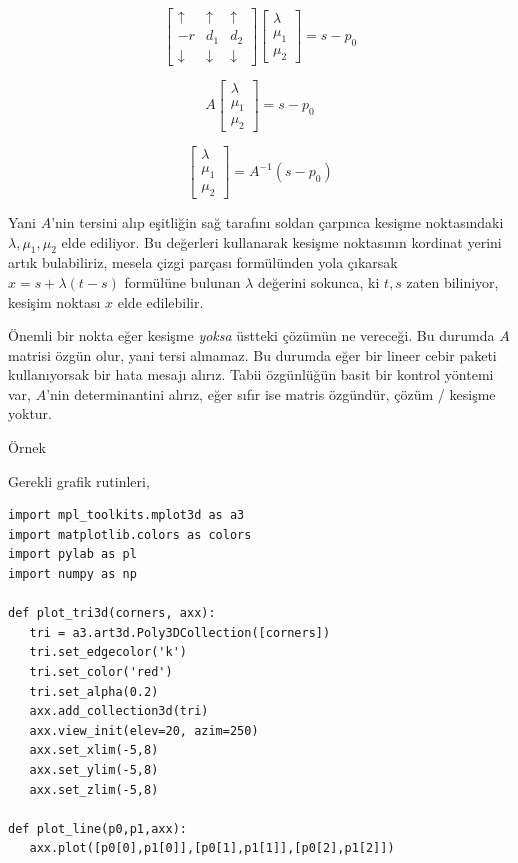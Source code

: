 \documentclass[12pt,fleqn]{article}\usepackage{../../common}
\begin{document}
$$
\left[\begin{array}{ccc}
\uparrow & \uparrow & \uparrow  \\
 -r & d_1 & d_2 \\
\downarrow & \downarrow & \downarrow 
\end{array}\right]
\left[\begin{array}{ccc}
\lambda \\ \mu_1 \\ \mu_2 
\end{array}\right] = s - p_0
$$

$$
A
\left[\begin{array}{ccc}
\lambda \\ \mu_1 \\ \mu_2 
\end{array}\right] = s - p_0
$$

$$
\left[\begin{array}{ccc}
\lambda \\ \mu_1 \\ \mu_2 
\end{array}\right] = A^{-1} (s - p_0)
$$

Yani $A$'nin tersini alıp eşitliğin sağ tarafını soldan çarpınca kesişme
noktasındaki $\lambda,\mu_1,\mu_2$ elde ediliyor. Bu değerleri kullanarak
kesişme noktasının kordinat yerini artık bulabiliriz, mesela çizgi parçası
formülünden yola çıkarsak $x = s + \lambda (t-s)$ formülüne bulunan $\lambda$
değerini sokunca, ki $t,s$ zaten biliniyor, kesişim noktası $x$ elde edilebilir.

Önemli bir nokta eğer kesişme {\em yoksa} üstteki çözümün ne vereceği. Bu
durumda $A$ matrisi özgün olur, yani tersi alınamaz. Bu durumda eğer bir lineer
cebir paketi kullanıyorsak bir hata mesajı alırız. Tabii özgünlüğün basit bir
kontrol yöntemi var, $A$'nin determinantini alırız, eğer sıfır ise matris
özgündür, çözüm / kesişme yoktur.

Örnek

Gerekli grafik rutinleri,

\begin{verbatim}
import mpl_toolkits.mplot3d as a3
import matplotlib.colors as colors
import pylab as pl
import numpy as np

def plot_tri3d(corners, axx):
   tri = a3.art3d.Poly3DCollection([corners])   
   tri.set_edgecolor('k')
   tri.set_color('red')
   tri.set_alpha(0.2)
   axx.add_collection3d(tri)
   axx.view_init(elev=20, azim=250)
   axx.set_xlim(-5,8)
   axx.set_ylim(-5,8)
   axx.set_zlim(-5,8)

def plot_line(p0,p1,axx):
   axx.plot([p0[0],p1[0]],[p0[1],p1[1]],[p0[2],p1[2]])
   
\end{verbatim}
\end{document}
